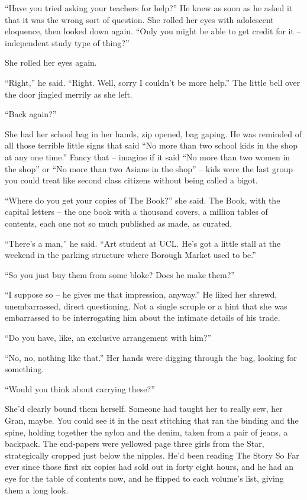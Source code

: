 “Have you tried asking your teachers for help?” He knew as soon as 
he asked it that it was the wrong sort of question. She rolled her eyes 
with adolescent eloquence, then looked down again. “Only you might be 
able to get credit for it -- independent study type of thing?”

She rolled her eyes again.

“Right,” he said. “Right. Well, sorry I couldn't be more help.” 
The little bell over the door jingled merrily as she left.

\tb

“Back again?”

She had her school bag in her hands, zip opened, bag gaping. He was 
reminded of all those terrible little signs that said “No more than 
two school kids in the shop at any one time.” Fancy that -- imagine 
if it said “No more than two women in the shop” or “No more than 
two Asians in the shop” -- kids were the last group you could treat 
like second class citizens without being called a bigot.

“Where do you get your copies of The Book?” she said. The Book, 
with the capital letters -- the one book with a thousand covers, a 
million tables of contents, each one not so much published as made, as 
curated.

“There's a man,” he said. “Art student at UCL. He's got a little 
stall at the weekend in the parking structure where Borough Market used 
to be.”

“So you just buy them from some bloke? Does he make them?”

“I suppose so -- he gives me that impression, anyway.” He liked her 
shrewd, unembarrassed, direct questioning. Not a single scruple or a 
hint that she was embarrassed to be interrogating him about the 
intimate details of his trade.

“Do you have, like, an exclusive arrangement with him?”

“No, no, nothing like that.” Her hands were digging through the 
bag, looking for something.

“Would you think about carrying these?”

She'd clearly bound them herself. Someone had taught her to really sew, 
her Gran, maybe. You could see it in the neat stitching that ran the 
binding and the spine, holding together the nylon and the denim, taken 
from a pair of jeans, a backpack. The end-papers were yellowed page 
three girls from the Star, strategically cropped just below the 
nipples. He'd been reading The Story So Far ever since those first six 
copies had sold out in forty eight hours, and he had an eye for the 
table of contents now, and he flipped to each volume's list, giving 
them a long look.

